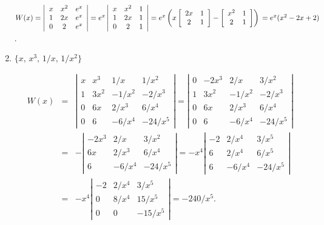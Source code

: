 \documentclass{ximera}
\begin{document}
\begin{problem}
\begin{enumerate}
\begin{solution}
$W(x)=\left|\begin{array}{ccc}x&x^2&e^x
\\1&2x&e^x\\0&2&e^x\end{array}\right|
=e^x\left|\begin{array}{ccc}x&x^2&1
\\1&2x&1\\0&2&1\end{array}\right|=
e^x\left(
x\left[\begin{array}{cc}2x&1\\2&1\end{array}\right]-
\left[\begin{array}{cc}x^2&1\\2&1\end{array}\right]
\right)\\
=e^x(x^2-2x+2)$.
\end{solution}

\item $\{x,\,x^3,\,1/x,\,1/x^2\}$

\begin{solution}
\begin{eqnarray*}
W(x)&=&\left|\begin{array}{cccc}
x&x^3&1/x&1/x^2\\
1&3x^2&-1/x^2&-2/x^3\\
0&6x&2/x^3&6/x^4\\
0&6&-6/x^4&-24/x^5
\end{array}\right|
=\left|\begin{array}{cccc}
0&-2x^3&2/x&3/x^2\\
1&3x^2&-1/x^2&-2/x^3\\
0&6x&2/x^3&6/x^4\\
0&6&-6/x^4&-24/x^5
\end{array}\right|\\
&=&-\left|\begin{array}{ccc}
-2x^3&2/x&3/x^2\\
6x&2/x^3&6/x^4\\
6&-6/x^4&-24/x^5
\end{array}\right|
=-x^4\left|\begin{array}{rcc}
-2&2/x^4&3/x^5\\
6&2/x^4&6/x^5\\
6&-6/x^4&-24/x^5
\end{array}\right|\\
&=&-x^4\left|\begin{array}{rcr}
-2&2/x^4&3/x^5\\
0&8/x^4&15/x^5\\
0&0&-15/x^5
\end{array}\right|=-240/x^5.
\end{eqnarray*}
\end{solution}


\end{enumerate}
\end{problem}
\end{document}
